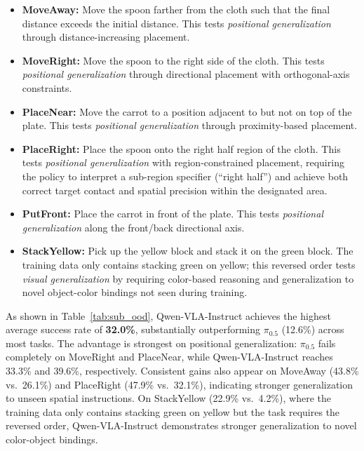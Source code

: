 \documentclass{llmxive}
\begin{document}
\begin{itemize}[leftmargin=*,itemsep=2pt]      
      \item \textbf{MoveAway:} Move the spoon farther from the cloth such that the final distance exceeds the initial distance. This tests \textit{positional generalization} through distance-increasing placement.
      
      \item \textbf{MoveRight:} Move the spoon to the right side of the cloth. This tests \textit{positional generalization} through directional placement with orthogonal-axis constraints.                     

      \item \textbf{PlaceNear:} Move the carrot to a position adjacent to but not on top of the plate. This tests \textit{positional generalization} through proximity-based placement.
      
      \item \textbf{PlaceRight:} Place the spoon onto the right half region of the cloth. This tests \textit{positional generalization} with region-constrained placement, requiring the policy to interpret a sub-region specifier (``right half'') and achieve both correct target contact and
   spatial precision within the designated area.            

      \item \textbf{PutFront:} Place the carrot in front of the plate. This tests \textit{positional generalization} along the front/back directional axis.

      \item \textbf{StackYellow:} Pick up the yellow block and stack it on the green block. The training data only contains stacking green on yellow; this reversed order tests \textit{visual generalization} by requiring color-based reasoning and generalization to novel object-color bindings not seen during training.
  \end{itemize}

As shown in Table~\ref{tab:sub_ood}, Qwen-VLA-Instruct achieves the highest average success rate of \textbf{32.0\%}, substantially outperforming $\pi_{0.5}$ (12.6\%) across most tasks. The
advantage is strongest on positional generalization: $\pi_{0.5}$ fails completely on MoveRight and PlaceNear, while Qwen-VLA-Instruct reaches 33.3\% and 39.6\%, respectively. Consistent
gains also appear on MoveAway (43.8\% vs.\ 26.1\%) and PlaceRight (47.9\% vs.\ 32.1\%), indicating stronger generalization to unseen spatial instructions.
On StackYellow (22.9\% vs.\ 4.2\%), where the training data only contains stacking green on yellow but the task requires the reversed order, Qwen-VLA-Instruct demonstrates stronger generalization
to novel color-object bindings.
\end{document}
